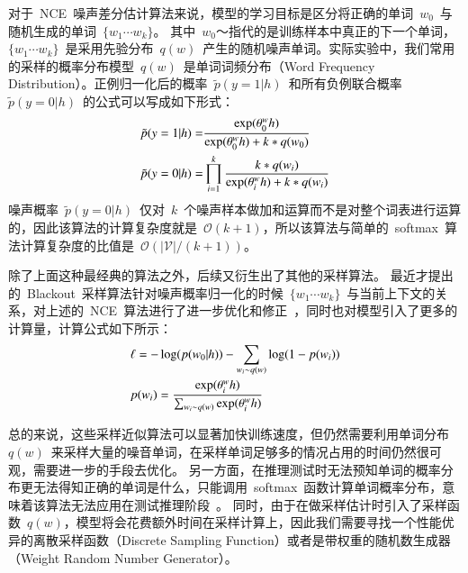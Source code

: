 对于~NCE~噪声差分估计算法来说，模型的学习目标是区分将正确的单词~$w_0$~与随机生成的单词~$\{w_1\cdots w_k\}$。
其中~$w_0$～指代的是训练样本中真正的下一个单词，$\{w_1\cdots w_k\}$~是采用先验分布~$q(w)$~产生的随机噪声单词。实际实验中，我们常用的采样的概率分布模型~$q(w)$~是单词词频分布（Word Frequency Distribution）。正例归一化后的概率~$\tilde{p}(y=1|h)$~和所有负例联合概率~$\tilde{p}(y=0|h)$~的公式可以写成如下形式：
\begin{equation}\label{equ:nce}
\setlength{\abovedisplayskip}{10pt}
\setlength{\belowdisplayskip}{10pt}
\begin{split}
  \tilde{p}(y=1|h)=&\frac{\exp( \theta^w_0 h)}{ \exp( \theta^w_0 h)+k *q(w_0)}\\
  \tilde{p}(y=0|h)=&\prod_{i=1}^{k}\frac{k *q(w_i)}{\exp( \theta^w_i h)+k *q(w_i)}\\
\end{split}
\end{equation}
噪声概率~$\tilde{p}(y=0|h)$~仅对~$k$~个噪声样本做加和运算而不是对整个词表进行运算的，因此该算法的计算复杂度就是~$\mathcal{O}(k+1)$，所以该算法与简单的~softmax~算法计算复杂度的比值是~$\mathcal{O}(\mathcal{|V|}/(k+1))$。

除了上面这种最经典的算法之外，后续又衍生出了其他的采样算法。
最近才提出的~Blackout~采样算法针对噪声概率归一化的时候~$\{w_1\cdots w_k\}$~与当前上下文的关系，对上述的~NCE~算法进行了进一步优化和修正~，同时也对模型引入了更多的计算量，计算公式如下所示：
\begin{equation}
\setlength{\abovedisplayskip}{10pt}
\setlength{\belowdisplayskip}{10pt}
\begin{split}
&\ell=-\log(p(w_0|h)) - \sum_{w_i \sim q(w)} \log(1 - p(w_i))\\
&p(w_i) = \frac{\exp(\theta^w_i h)}{\sum_{w_i \sim q(w)} \exp(\theta^w_i h)}
\end{split}
\end{equation}

总的来说，这些采样近似算法可以显著加快训练速度，但仍然需要利用单词分布$q(w)$~来采样大量的噪音单词，在采样单词足够多的情况占用的时间仍然很可观，需要进一步的手段去优化。
另一方面，在推理测试时无法预知单词的概率分布更无法得知正确的单词是什么，只能调用~softmax~函数计算单词概率分布，意味着该算法无法应用在测试推理阶段~。
同时，由于在做采样估计时引入了采样函数~$q(w)$，模型将会花费额外时间在采样计算上，因此我们需要寻找一个性能优异的离散采样函数（Discrete Sampling Function）或者是带权重的随机数生成器（Weight Random Number Generator）。



